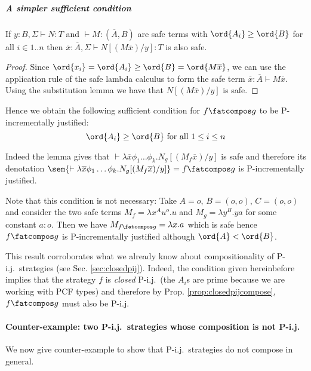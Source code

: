 \subparagraph{A simpler sufficient condition}
\begin{lemma}
If $y:B, \Sigma \vdash N : T$ and $\vdash M : (\overline{A}, B)$
are safe terms with $\ord{A_i} \geq \ord{B}$ for all $i\in 1..n$
then $\overline{x}:\overline{A}, \Sigma \vdash N[(M \overline{x})/y] :T$ is also safe.
\end{lemma}
\begin{proof}
Since $\ord{x_i} = \ord{A_i} \geq \ord{B} = \ord{M \overline{x}}$, we can use the application
rule of the safe lambda calculus to form the safe term $\overline{x}:\overline{A} \vdash M \overline{x}$.
Using the substitution lemma we have that $N[(M \overline{x})/y]$ is safe.
\end{proof}

Hence we obtain the following sufficient condition for $f\fatcompos
g$ to be P-incrementally justified:
$$\ord{A_i}\geq\ord{B} \mbox{ for all } 1 \leq i \leq n$$


Indeed the lemma gives that $\vdash \lambda \overline{x} \phi_1
\dots \phi_k. N_g [(M_f \overline{x}) / y]$ is safe and therefore
its denotation $\sem{\vdash \lambda \overline{x} \phi_1 \dots
\phi_k. N_g [(M_f \overline{x}) / y]} = f\fatcompos g$ is
P-incrementally justified.

Note that this condition is not necessary: Take $A=o$, $B=(o,o)$,
$C=(o,o)$ and consider the two safe terms $M_f = \lambda x^A u^o.u$
and $M_g = \lambda y^B . y a$ for  some constant $a:o$. Then we have
$M_{f\fatcompos g} = \lambda x . a$ which is safe hence $f\fatcompos
g$ is P-incrementally justified although $\ord{A} < \ord{B}$.

\begin{remark}
This result corroborates what we already know about compositionality
of P-i.j.\ strategies (see Sec. \ref{sec:closedpij}). Indeed, the
condition given hereinbefore implies that the strategy $f$ is
\emph{closed} P-i.j.\ (the $A_i$s are prime because we are working
with PCF types) and therefore by Prop. \ref{prop:closedpijcompose},
$f \fatcompos g$ must also be P-i.j.
\end{remark}




\paragraph{Counter-example: two P-i.j.\ strategies whose composition is not
P-i.j.}

We now give counter-example to show that P-i.j.\ strategies do not
compose in general.

